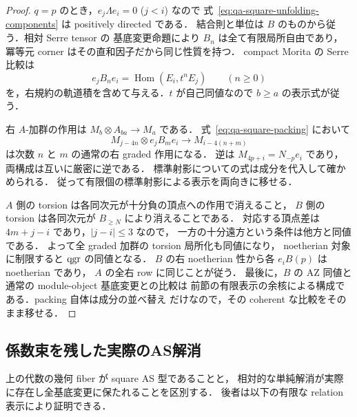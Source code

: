 \begin{proof}
$q=p$ のとき，$e_j\Lambda e_i=0$ ($j<i$) なので
式~\eqref{eq:qa-square-unfolding-components} は positively directed である．
結合則と単位は $B$ のものから従う．相対 Serre tensor の
基底変更命題により $B_n$ は全て有限局所自由であり，
冪等元 corner はその直和因子だから同じ性質を持つ．
compact Morita の Serre 比較は
\[
 e_jB_ne_i=\operatorname{Hom}(E_i,t^nE_j)\qquad(n\ge0)
\]
を，右規約の軌道積を含めて与える．$t$ が自己同値なので
$b\ge a$ の表示式が従う．

右 $A$-加群の作用は $M_b\otimes A_{ba}\to M_a$ である．
式~\eqref{eq:qa-square-packing} において
\[
 M_{j-4n}\otimes e_jB_me_i\longrightarrow M_{i-4(n+m)}
\]
は次数 $n$ と $m$ の通常の右 graded 作用になる．
逆は $M_{4p+i}=N_{-p}e_i$ であり，両構成は互いに厳密に逆である．
標準射影についての式は成分を代入して確かめられる．
従って有限個の標準射影による表示を両向きに移せる．

$A$ 側の torsion は各同次元が十分負の頂点への作用で消えること，
$B$ 側の torsion は各同次元が $B_{\ge N}$ により消えることである．
対応する頂点差は $4m+j-i$ であり，$|j-i|\le3$ なので，
一方の十分遠方という条件は他方と同値である．
よって全 graded 加群の torsion 局所化も同値になり，
noetherian 対象に制限すると $\operatorname{qgr}$ の同値となる．
$B$ の右 noetherian 性から各 $e_iB(p)$ は noetherian であり，
$A$ の全右 row に同じことが従う．
最後に，$B$ の AZ 同値と通常の module-object 基底変更との比較は
前節の有限表示の余核による構成である．packing 自体は成分の並べ替え
だけなので，その coherent な比較をそのまま移せる．
\end{proof}

\subsection{係数束を残した実際のAS解消}
\label{subsec:qa-relative-square-simple-resolutions}

上の代数の幾何 fiber が square AS 型であることと，
相対的な単純解消が実際に存在し全基底変更に保たれることを区別する．
後者は以下の有限な relation 表示により証明できる．

